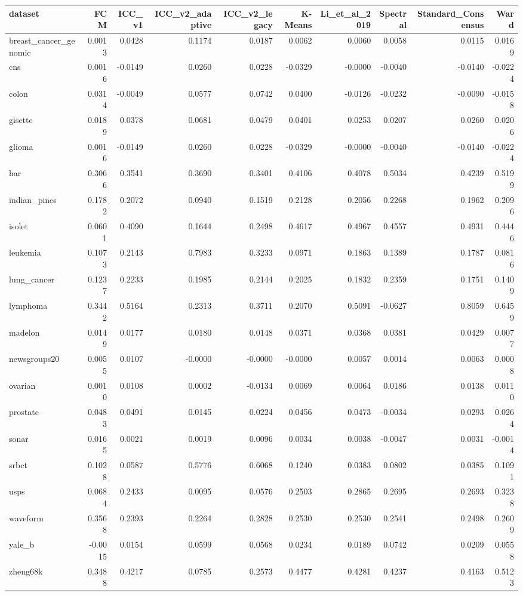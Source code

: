 \begin{tabular}{lrrrrrrrrr}
\toprule
dataset & FCM & ICC_v1 & ICC_v2_adaptive & ICC_v2_legacy & K-Means & Li_et_al_2019 & Spectral & Standard_Consensus & Ward \\
\midrule
breast_cancer_genomic & 0.0013 & 0.0428 & 0.1174 & 0.0187 & 0.0062 & 0.0060 & 0.0058 & 0.0115 & 0.0169 \\
cns & 0.0016 & -0.0149 & 0.0260 & 0.0228 & -0.0329 & -0.0000 & -0.0040 & -0.0140 & -0.0224 \\
colon & 0.0314 & -0.0049 & 0.0577 & 0.0742 & 0.0400 & -0.0126 & -0.0232 & -0.0090 & -0.0158 \\
gisette & 0.0189 & 0.0378 & 0.0681 & 0.0479 & 0.0401 & 0.0253 & 0.0207 & 0.0260 & 0.0206 \\
glioma & 0.0016 & -0.0149 & 0.0260 & 0.0228 & -0.0329 & -0.0000 & -0.0040 & -0.0140 & -0.0224 \\
har & 0.3066 & 0.3541 & 0.3690 & 0.3401 & 0.4106 & 0.4078 & 0.5034 & 0.4239 & 0.5199 \\
indian_pines & 0.1782 & 0.2072 & 0.0940 & 0.1519 & 0.2128 & 0.2056 & 0.2268 & 0.1962 & 0.2096 \\
isolet & 0.0601 & 0.4090 & 0.1644 & 0.2498 & 0.4617 & 0.4967 & 0.4557 & 0.4931 & 0.4446 \\
leukemia & 0.1073 & 0.2143 & 0.7983 & 0.3233 & 0.0971 & 0.1863 & 0.1389 & 0.1787 & 0.0816 \\
lung_cancer & 0.1237 & 0.2233 & 0.1985 & 0.2144 & 0.2025 & 0.1832 & 0.2359 & 0.1751 & 0.1409 \\
lymphoma & 0.3442 & 0.5164 & 0.2313 & 0.3711 & 0.2070 & 0.5091 & -0.0627 & 0.8059 & 0.6459 \\
madelon & 0.0149 & 0.0177 & 0.0180 & 0.0148 & 0.0371 & 0.0368 & 0.0381 & 0.0429 & 0.0077 \\
newsgroups20 & 0.0055 & 0.0107 & -0.0000 & -0.0000 & -0.0000 & 0.0057 & 0.0014 & 0.0063 & 0.0008 \\
ovarian & 0.0010 & 0.0108 & 0.0002 & -0.0134 & 0.0069 & 0.0064 & 0.0186 & 0.0138 & 0.0110 \\
prostate & 0.0483 & 0.0491 & 0.0145 & 0.0224 & 0.0456 & 0.0473 & -0.0034 & 0.0293 & 0.0264 \\
sonar & 0.0165 & 0.0021 & 0.0019 & 0.0096 & 0.0034 & 0.0038 & -0.0047 & 0.0031 & -0.0014 \\
srbct & 0.1028 & 0.0587 & 0.5776 & 0.6068 & 0.1240 & 0.0383 & 0.0802 & 0.0385 & 0.1091 \\
usps & 0.0684 & 0.2433 & 0.0095 & 0.0576 & 0.2503 & 0.2865 & 0.2695 & 0.2693 & 0.3238 \\
waveform & 0.3568 & 0.2393 & 0.2264 & 0.2828 & 0.2530 & 0.2530 & 0.2541 & 0.2498 & 0.2609 \\
yale_b & -0.0015 & 0.0154 & 0.0599 & 0.0568 & 0.0234 & 0.0189 & 0.0742 & 0.0209 & 0.0558 \\
zheng68k & 0.3488 & 0.4217 & 0.0785 & 0.2573 & 0.4477 & 0.4281 & 0.4237 & 0.4163 & 0.5123 \\
\bottomrule
\end{tabular}
